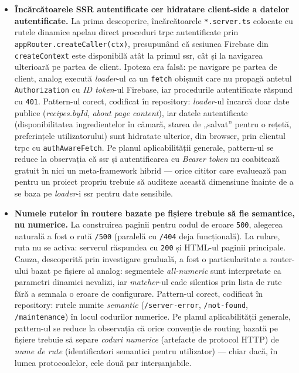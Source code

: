\begin{itemize}
  \item \textbf{Încărcătoarele SSR autentificate cer hidratare client-side a datelor autentificate.} La prima descoperire, încărcătoarele \texttt{*.server.ts} colocate cu rutele dinamice apelau direct proceduri \acrshort{trpc} autentificate prin \texttt{appRouter.createCaller(ctx)}, presupunând că sesiunea Firebase din \texttt{createContext} este disponibilă atât la primul \acrshort{ssr}, cât și la navigarea ulterioară pe partea de client. Ipoteza era falsă: pe navigare pe partea de client, \gls{analog} execută \textit{loader}-ul ca un \texttt{fetch} obișnuit care nu propagă antetul \texttt{Authorization} cu \textit{ID token}-ul Firebase, iar procedurile autentificate răspund cu \texttt{401}. Pattern-ul corect, codificat în repository: \textit{loader}-ul încarcă doar date publice (\textit{recipes.byId}, \textit{about page content}), iar datele autentificate (disponibilitatea ingredientelor în cămară, starea de „salvat” pentru o rețetă, preferințele utilizatorului) sunt hidratate ulterior, din browser, prin clientul \gls{trpc} cu \texttt{authAwareFetch}. Pe planul aplicabilității generale, pattern-ul se reduce la observația că \acrshort{ssr} și autentificarea cu \textit{Bearer token} nu coabitează gratuit în nici un meta-framework hibrid --- orice cititor care evaluează \gls{pan} pentru un proiect propriu trebuie să auditeze această dimensiune înainte de a se baza pe \textit{loader}-i \acrshort{ssr} pentru date sensibile.

  \item \textbf{Numele rutelor în routere bazate pe fișiere trebuie să fie semantice, nu numerice.} La construirea paginii pentru codul de eroare \texttt{500}, alegerea naturală a fost o rută \texttt{/500} (paralelă cu \texttt{/404} deja funcțională). La rulare, ruta nu se activa: serverul răspundea cu \texttt{200} și HTML-ul paginii principale. Cauza, descoperită prin investigare graduală, a fost o particularitate a router-ului bazat pe fișiere al \gls{analog}: segmentele \textit{all-numeric} sunt interpretate ca parametri dinamici nevalizi, iar \textit{matcher}-ul cade silentios prin lista de rute fără a semnala o eroare de configurare. Pattern-ul corect, codificat în repository: rutele numite \textit{semantic} (\texttt{/server-error}, \texttt{/not-found}, \texttt{/maintenance}) în locul codurilor numerice. Pe planul aplicabilității generale, pattern-ul se reduce la observația că orice convenție de routing bazată pe fișiere trebuie să separe \textit{coduri numerice} (artefacte de protocol HTTP) de \textit{nume de rute} (identificatori semantici pentru utilizator) --- chiar dacă, în lumea protocoalelor, cele două par interșanjabile.


\end{itemize}
